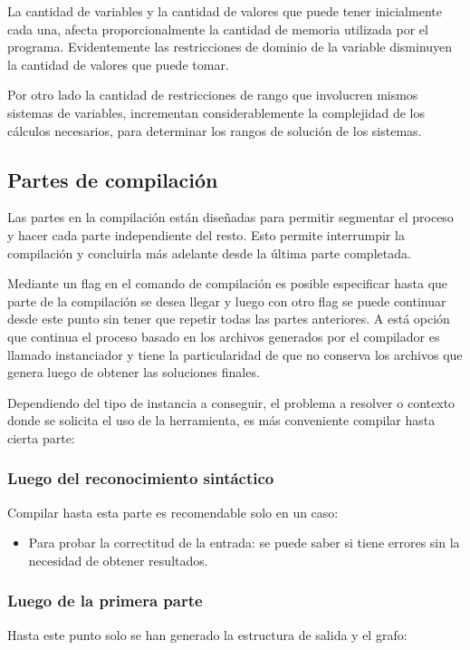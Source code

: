 La cantidad de variables y la cantidad de valores que puede tener inicialmente 
cada una, afecta proporcionalmente la cantidad de memoria utilizada por el 
programa. Evidentemente las restricciones de dominio de la variable disminuyen 
la cantidad de valores que puede tomar.

Por otro lado la cantidad de restricciones de rango que involucren mismos 
sistemas de variables, incrementan considerablemente la complejidad de los 
cálculos necesarios, para determinar los rangos de solución de los sistemas.

\subsection{Partes de compilación}\label {imp_y_res:comp}
Las partes en la compilación están diseñadas para permitir segmentar el proceso y
hacer cada parte independiente del resto. Esto permite interrumpir la 
compilación y concluirla más adelante desde la última parte completada.

Mediante un flag en el comando de compilación es posible especificar hasta que 
parte de la compilación se desea llegar y luego con otro flag se puede continuar 
desde este punto sin tener que repetir todas las partes anteriores. A está opción
que continua el proceso basado en los archivos generados por el compilador es llamado instanciador y 
tiene la particularidad de que no conserva los archivos que genera luego de 
obtener las soluciones finales.

Dependiendo del tipo de instancia a conseguir, el problema a resolver o contexto
donde se solicita el uso de la herramienta, es más conveniente compilar hasta 
cierta parte:

\subsubsection{Luego del reconocimiento sintáctico}
Compilar hasta esta parte es recomendable solo en un caso: 

\begin{itemize}
\item {Para probar la correctitud de la entrada: se puede saber si tiene
errores sin la necesidad de obtener resultados.}
\end{itemize} 
 
\subsubsection{Luego de la primera parte}
Hasta este punto solo se han generado la estructura de salida y el grafo:

